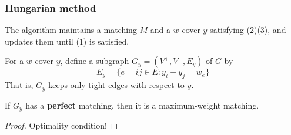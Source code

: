 \documentclass[14pt,aspectratio=169,xcolor=dvipsnames,table,onlytextwidth]{beamer}
\begin{document}
\begin{frame}
    \frametitle{Hungarian method}

    \small
    The algorithm maintains a matching $M$ and a $w$-cover $y$ satisfying (2)(3), and updates them until (1) is satisfied.

    \begin{definition}
        For a $w$-cover $y$, define a subgraph $G_y = (V^+, V^-, E_y)$ of $G$ by
        \[
            E_y = \{e = ij \in E : y_i + y_j = w_e \}
        \]
        That is, $G_y$ keeps only tight edges with respect to $y$.
    \end{definition}

    \begin{lemma}
        If $G_y$ has a \textbf{perfect} matching, then it is a maximum-weight matching.
    \end{lemma}
    \begin{proof}
        Optimality condition!
    \end{proof}

\end{frame}
\end{document}
